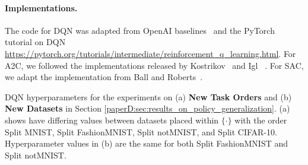 \vspace{-3mm}
\paragraph{Implementations.} 
The code for DQN was adapted from OpenAI baselines~ and the PyTorch~ tutorial on DQN {\small \url{https://pytorch.org/tutorials/intermediate/reinforcement_q_learning.html}}. For A2C, we followed the implementations released by Kostrikov~ and Igl \etal~. For SAC, we adapt the implementation from Ball and Roberts~. 



\begin{table}[h]
	\centering 
	\caption{DQN hyperparameters for the experiments on (a) {\bf New Task Orders} and (b) {\bf New Datasets} in Section \ref{paperD:sec:results_on_policy_generalization}. (a) shows have differing values between datasets placed within $\{\cdot\}$ with the order Split MNIST, Split FashionMNIST, Split notMNIST, and Split CIFAR-10. Hyperparameter values in (b) are the same for both Split FashionMNIST and Split notMNIST. }
	\vspace{-1mm}
	\begin{subtable}{.6\textwidth}
		\centering
		\caption{{\bf New Task Orders}.}
		\vspace{-2mm}
\end{subtable}
\end{table}
